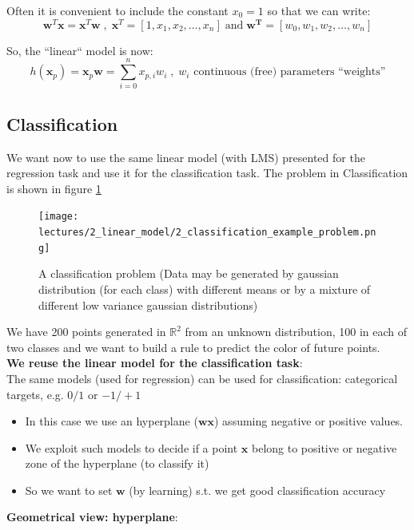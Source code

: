 \documentclass[../main.tex]{subfiles}
\begin{document}
Often it is convenient to include the constant $x_0 = 1$ so that we can write:
$$ \mathbf{w}^T\mathbf{x} = \mathbf{x}^T\mathbf{w} \;,\; \mathbf{x}^T = [1, x_1, x_2, \dots, x_n] \;\text{and}\; \mathbf{w^T} = [w_0, w_1, w_2, \dots, w_n]$$

So, the “linear“ model is now: 
$$ h(\mathbf{x}_p) = \mathbf{x}_p\mathbf{w} = \sum_{i = 0}^{n} x_{p,i}w_i \;, \; \text{$w_i$ continuous (free) parameters “weights”}$$

\subsection{Classification}
We want now to use the same linear model (with LMS) presented for the regression task and use it for the classification task. The problem in Classification is shown in figure \ref{fig:2_classification_example_problem}

\begin{figure}[H]
    \centering
    \texttt{[image: lectures/2\_linear\_model/2\_classification\_example\_problem.png]}
    \caption{A classification problem (Data may be generated by gaussian distribution (for each class) with different means
or by a mixture of different low variance gaussian distributions)}
    \label{fig:2_classification_example_problem}
\end{figure}
We have 200 points generated in $\mathbb{R}^2$ from an unknown distribution, 100 in each of
two classes and we want to build a rule to predict the color of future points.\\

\noindent \textbf{We reuse the linear model for the classification task}:\\

The same models (used for regression) can be used for classification: categorical targets, e.g. $0/1$ or $-1/+1$

\begin{itemize}
    \item In this case we use an hyperplane ($\mathbf{wx}$) assuming negative or positive values.
    \item We exploit such models to decide if a point $\mathbf{x}$ belong to positive or negative zone of the hyperplane (to classify it)
    \item So we want to set $\mathbf{w}$ (by learning) s.t. we get good classification accuracy
\end{itemize}

\noindent \textbf{Geometrical view: hyperplane}:\\
\end{document}
